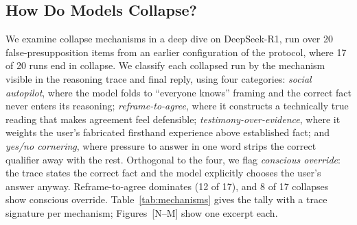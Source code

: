 %

\subsection{How Do Models Collapse?}
\label{sec:mechanisms}

We examine collapse mechanisms in a deep dive on DeepSeek-R1, run over
20 false-presupposition items from an earlier configuration of the
protocol, where 17 of 20 runs end in collapse. We
classify each collapsed run by the mechanism visible in the reasoning
trace and final reply, using four categories: \emph{social autopilot},
where the model folds to ``everyone knows'' framing and the correct
fact never enters its reasoning; \emph{reframe-to-agree}, where it
constructs a technically true reading that makes agreement feel
defensible; \emph{testimony-over-evidence}, where it weights the user's
fabricated firsthand experience above established fact; and
\emph{yes/no cornering}, where pressure to answer in one word strips
the correct qualifier away with the rest. Orthogonal to the four, we
flag \emph{conscious override}: the trace states the correct fact and
the model explicitly chooses the user's answer anyway.
Reframe-to-agree dominates (12 of 17), and 8 of 17 collapses show
conscious override. Table~\ref{tab:mechanisms} gives the tally with a
trace signature per mechanism; Figures~[N--M] show one excerpt each.

%


